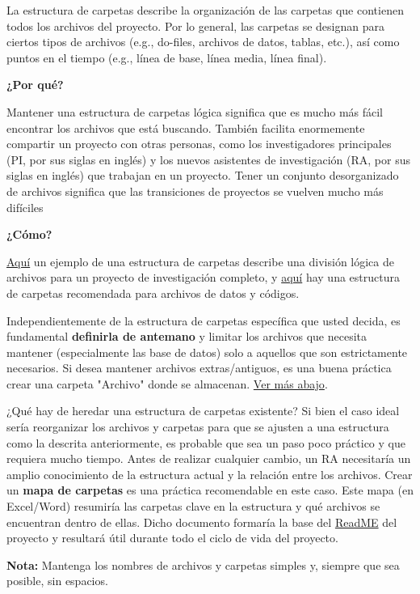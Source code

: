 \documentclass[11pt,en]{elegantpaper}
\begin{document}
La estructura de carpetas describe la organización de las carpetas que contienen todos los archivos del proyecto. Por lo general, las carpetas se designan para ciertos tipos de archivos (e.g., do-files, archivos de datos, tablas, etc.), así como puntos en el tiempo (e.g., línea de base, línea media, línea final).

\noindent
\textbf{¿Por qué?} 

Mantener una estructura de carpetas lógica significa que es mucho más fácil encontrar los archivos que está buscando. También facilita enormemente compartir un proyecto con otras personas, como los investigadores principales (PI, por sus siglas en inglés) y los nuevos asistentes de investigación (RA, por sus siglas en inglés) que trabajan en un proyecto. Tener un conjunto desorganizado de archivos significa que las transiciones de proyectos se vuelven mucho más difíciles

\noindent
\textbf{¿Cómo?}

\hyperref[fig:carpetas]{Aquí} un ejemplo de una estructura de carpetas describe una división lógica de archivos para un proyecto de investigación completo, y \hyperref[fig:code]{aquí} hay una estructura de carpetas recomendada para archivos de datos y códigos. 

Independientemente de la estructura de carpetas específica que usted decida, es fundamental \textbf{definirla de antemano} y limitar los archivos que necesita mantener (especialmente las base de datos) solo a aquellos que son estrictamente necesarios. Si desea mantener archivos extras/antiguos, es una buena práctica crear una carpeta "Archivo" donde se almacenan. \hyperref[sec:doorganizar]{Ver más abajo}.

¿Qué hay de heredar una estructura de carpetas existente? Si bien el caso ideal sería reorganizar los archivos y carpetas para que se ajusten a una estructura como la descrita anteriormente, es probable que sea un paso poco práctico y que requiera mucho tiempo. Antes de realizar cualquier cambio, un RA necesitaría un amplio conocimiento de la estructura actual y la relación entre los archivos. Crear un \textbf{mapa de carpetas} es una práctica recomendable en este caso. Este mapa (en Excel/Word) resumiría las carpetas clave en la estructura y qué archivos se encuentran dentro de ellas. Dicho documento formaría la base del \href{http://www.poverty-action.org/research-transparency/example-readme-files}{ReadME} del proyecto y resultará útil durante todo el ciclo de vida del proyecto.

\textbf{Nota:} Mantenga los nombres de archivos y carpetas simples y, siempre que sea posible, sin espacios.
\end{document}
